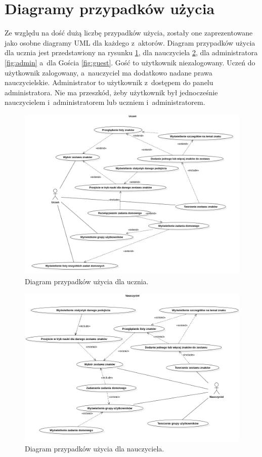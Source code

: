 \documentclass[a4paper,twoside,12pt]{book}
\begin{document}
\section{Diagramy przypadków użycia}
Ze względu na dość dużą liczbę przypadków użycia, zostały one zaprezentowane jako osobne diagramy UML dla każdego z~aktorów. Diagram przypadków użycia dla ucznia jest przedstawiony na rysunku \ref{fig:uczen}, dla nauczyciela \ref{fig:nauczyciel}, dla administratora \ref{fig:admin} a~dla Gościa \ref{fig:guest}. Gość to użytkownik niezalogowany. Uczeń do użytkownik zalogowany, a~nauczyciel ma dodatkowo nadane prawa nauczycielskie. Administrator to użytkownik z~dostępem do panelu administratora. Nie ma przeszkód, żeby użytkownik był jednocześnie nauczycielem i~administratorem lub uczniem i~administratorem.
\begin{figure}[]
\centering
\includegraphics[width=\textwidth]{Uczen}
\caption{Diagram przypadków użycia dla ucznia.}
\label{fig:uczen}
\end{figure}
\begin{figure}[]
\centering
\includegraphics[width=\textwidth]{Nauczyciel}
\caption{Diagram przypadków użycia dla nauczyciela.}
\label{fig:nauczyciel}
\end{figure}
\end{document}
